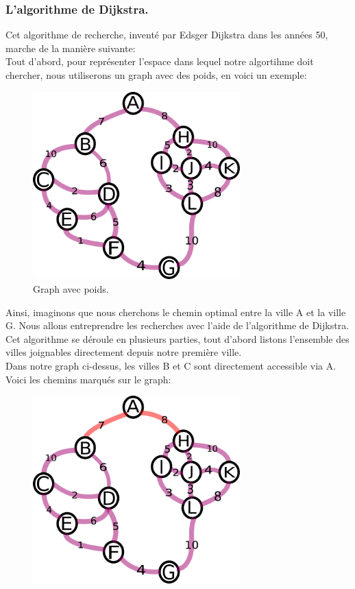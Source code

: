 \documentclass[a4paper, 12pt]{article}
\numberwithin{equation}{subsection}
\begin{document}
\subsubsection{L'algorithme de Dijkstra.}
Cet algorithme de recherche, inventé par Edsger Dijkstra dans les années 50, marche de la manière suivante: \\
Tout d'abord, pour représenter l'espace dans lequel notre algortihme doit chercher, nous utiliserons un graph avec des poids, en voici un exemple: \\
\begin{figure}[H]
  \centering
  \includegraphics[width=8.0cm]{imgs/numbered_graph.png}
  \caption{Graph avec poids.}
\end{figure}
Ainsi, imaginons que nous cherchons le chemin optimal entre la ville A et la ville G. Nous allons entreprendre les recherches avec l'aide de l'algorithme de Dijkstra.
Cet algorithme se déroule en plusieurs parties, tout d'abord listons l'ensemble des villes joignables directement depuis notre première ville. \\
Dans notre graph ci-dessus, les villes B et C sont directement accessible via A.\\
Voici les chemins marqués sur le graph: \\
\begin{figure}[H]
  \centering
  \includegraphics[width=8.0cm]{imgs/second_search.png}
\end{figure}
\end{document}
